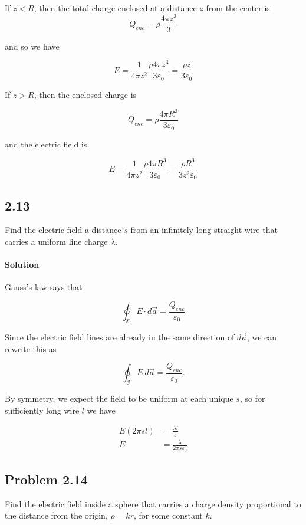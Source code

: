 \documentclass{article}
\begin{document}
If $z < R$, then the total charge enclosed at a distance $z$ from the center is 
$$
Q_{enc} = \rho \frac{4\pi z^3}{3}
$$ 

and so we have 

$$
E =  \frac{1}{4\pi z^2}\frac{\rho 4\pi z^3}{3\varepsilon_0} = \frac{\rho z}{3\varepsilon_0}
$$

If $z > R$, then the enclosed charge is 

$$Q_{enc} = \rho \frac{4\pi R^3}{3\varepsilon_0}$$

and the electric field is 

$$
E = \frac{1}{4\pi z^2}\frac{\rho 4\pi R^3}{3\varepsilon_0} = \frac{\rho R^3}{3z^2\varepsilon_0}
$$

\newpage

\subsection*{2.13}
Find the electric field a distance $s$ from an infinitely long straight wire that carries a uniform line charge $\lambda$.

\paragraph{Solution} Gauss's law says that 

$$
\oint_{\mathcal{S}}E \cdot d\vec{a} = \frac{Q_{enc}}{\varepsilon_0}
$$

Since the electric field lines are already in the same direction of $d\vec{a}$, we can rewrite this as 

$$
\oint_{\mathcal{S}}E\ d\vec{a} = \frac{Q_{enc}}{\varepsilon_0}.
$$

By symmetry, we expect the field to be uniform at each unique $s$, so for sufficiently long wire $l$ we have 

\begin{align*}
    E(2\pi s l) &= \frac{\lambda l}{\varepsilon} \\
    E &= \frac{\lambda}{2\pi s \varepsilon_0}
\end{align*}

\newpage

\subsection*{Problem 2.14} 
Find the electric field inside a sphere that carries a charge density proportional to the distance from the origin, $\rho = kr$, for some constant $k$.
\end{document}
